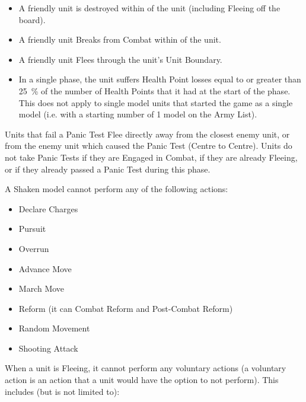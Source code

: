 \begin{minipage}[t]{0.485\textwidth}


\begin{itemize}[itemsep=0pt]
\item A friendly unit is destroyed within  of the unit (including Fleeing off the board).
\item A friendly unit Breaks from Combat within  of the unit.
\item A friendly unit Flees through the unit's Unit Boundary.
\item In a single phase, the unit suffers Health Point losses equal to or greater than \SI{25}{\percent} of the number of Health Points that it had at the start of the phase. This does not apply to single model units that started the game as a single model (i.e. with a starting number of 1 model on the Army List).
\end{itemize}

Units that fail a Panic Test Flee directly away from the closest enemy unit, or from the enemy unit which caused the Panic Test (Centre to Centre). Units do not take Panic Tests if they are Engaged in Combat, if they are already Fleeing, or if they already passed a Panic Test during this phase.


A Shaken model cannot perform any of the following actions:

\begin{itemize}[itemsep=0pt]
\item Declare Charges
\item Pursuit
\item Overrun
\item Advance Move
\item March Move
\item Reform (it can Combat Reform and Post-Combat Reform)
\item Random Movement
\item Shooting Attack
\end{itemize}

\end{minipage}\hfill\begin{minipage}[t]{0.485\textwidth}


When a unit is Fleeing, it cannot perform any voluntary actions (a voluntary action is an action that a unit would have the option to not perform). This includes (but is not limited to):


\end{minipage}
